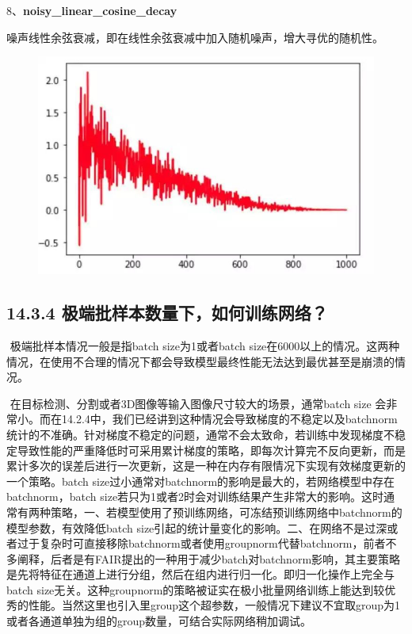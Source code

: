 8、\textbf{noisy\_linear\_cosine\_decay}

噪声线性余弦衰减，即在线性余弦衰减中加入随机噪声，增大寻优的随机性。

\begin{figure}
\centering
\includegraphics{./img/ch14/噪声线性余弦衰减.jpeg}
\caption{}
\end{figure}

\subsection{14.3.4
极端批样本数量下，如何训练网络？}\label{ux6781ux7aefux6279ux6837ux672cux6570ux91cfux4e0bux5982ux4f55ux8badux7ec3ux7f51ux7edc}

​ 极端批样本情况一般是指batch size为1或者batch
size在6000以上的情况。这两种情况，在使用不合理的情况下都会导致模型最终性能无法达到最优甚至是崩溃的情况。

​ 在目标检测、分割或者3D图像等输入图像尺寸较大的场景，通常batch size
会非常小。而在14.2.4中，我们已经讲到这种情况会导致梯度的不稳定以及batchnorm统计的不准确。针对梯度不稳定的问题，通常不会太致命，若训练中发现梯度不稳定导致性能的严重降低时可采用累计梯度的策略，即每次计算完不反向更新，而是累计多次的误差后进行一次更新，这是一种在内存有限情况下实现有效梯度更新的一个策略。batch
size过小通常对batchnorm的影响是最大的，若网络模型中存在batchnorm，batch
size若只为1或者2时会对训练结果产生非常大的影响。这时通常有两种策略，一、若模型使用了预训练网络，可冻结预训练网络中batchnorm的模型参数，有效降低batch
size引起的统计量变化的影响。二、在网络不是过深或者过于复杂时可直接移除batchnorm或者使用groupnorm代替batchnorm，前者不多阐释，后者是有FAIR提出的一种用于减少batch对batchnorm影响，其主要策略是先将特征在通道上进行分组，然后在组内进行归一化。即归一化操作上完全与batch
size无关。这种groupnorm的策略被证实在极小批量网络训练上能达到较优秀的性能。当然这里也引入里group这个超参数，一般情况下建议不宜取group为1或者各通道单独为组的group数量，可结合实际网络稍加调试。

